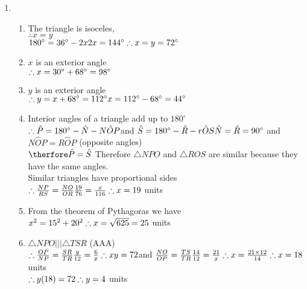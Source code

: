  \begin{solutions}{}{
\begin{enumerate}[itemsep=5pt, label=\textbf{\arabic*}. ] 


\item %
      \begin{enumerate}[noitemsep, label=\textbf{(\alph*)} ]
\item The triangle is isoceles,\\ $\therefore x=y$\\
$180^{\circ} = 36^{\circ}-2x\\
2x=144^{\circ}\\
\therefore x=y=72^{\circ}$
\item $x$ is an exterior angle\\
$\therefore x=30^{\circ}+68^{\circ} \\
=98^{\circ}$
\item $y$ is an exterior angle\\
$\therefore y = x+68^{\circ}= 112^{\circ}\\
x=112^{\circ}-68^{\circ} = 44^{\circ}$
\item Interior angles of a triangle add up to $180^{\circ}$\\
$\therefore \hat{P} = 180^{\circ} - \hat{N} - N\hat{O}P\\
$and $\hat{S} = 180^{\circ} - \hat{R} - r\hat{O}S\\
\hat{N} = \hat{R} = 90^{\circ}$ and $N\hat{O}P = R\hat{O}P$ (opposite angles)\\
$\therfore \hat{P} = \hat{S}\\$
Therefore $\triangle NPO$ and $\triangle ROS$ are similar because they have the same angles.\\
Similar triangles have proportional sides\\
$\therefore \frac{NP}{RS} = \frac{NO}{OR}\\
\frac{19}{76}=\frac{x}{116}\\
\therefore x = 19$ units

 
\item From the theorem of Pythagoras we have\\
$x^2 = 15^2 + 20^2\\
\therefore x = \sqrt{625}\\
=25$ units
\item $\triangle NPO ||| \triangle TSR$ (AAA)\\
$\therefore \frac{OP}{NP} = \frac{SR}{TR}\\
\frac{y}{12}=\frac{6}{x}\\
\therefore xy=72\\
$and $\frac{NO}{OP} = \frac{TS}{TR}\\
\frac{14}{12} = \frac{21}{x}\\
\therefore x = \frac{21 \times 12}{14}\\
\therefore x = 18$ units\\
$\therefore y(18)=72\\
\therefore y=4$ units



\end{enumerate}
\end{enumerate}}
\end{solutions}
